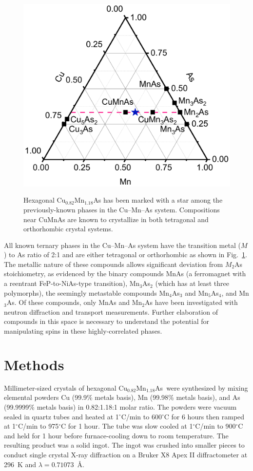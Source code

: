 \documentclass[10pt,doublespacing,edeposit]{uiucthesis2020}
\newcommand*{\cumnas}{Cu$_{0.82}$Mn$_{1.18}$As}
\begin{document}
\begin{mainmatter}
\begin{figure}
\centering\includegraphics[width=0.6\columnwidth]{figures/ch5/phase_diagram_cropped.pdf} \\
\caption{\label{fig:phase_diagram}
{\color{black}Hexagonal Cu$_{0.82}$Mn$_{1.18}$As has been marked with a star among the previously-known phases in the Cu--Mn--As system. Compositions near CuMnAs are known to crystallize in both tetragonal and orthorhombic crystal systems.}
} 
\end{figure}

{\color{black} All known ternary phases in the Cu--Mn--As system have the transition metal ($M$) to As ratio of 2:1 and are either tetragonal or orthorhombic as shown in Fig.\ \ref{fig:phase_diagram}.}
The metallic nature of these compounds allows significant deviation from $M_2$As stoichiometry, as evidenced by the binary compounds MnAs (a ferromagnet with a reentrant FeP-to-NiAs-type transition),\cite{pytlik_magnetic_1985,schwartz_magnetic_1971,Glazkov2003} Mn$_3$As$_2$ (which has at least three polymorphs),\cite{dietrich_crystal_1990,moller_crystal_1993,hagedorn_crystal_1994} the seemingly metastable compounds Mn$_4$As$_3$ and Mn$_5$As$_4$,\cite{hagedorn_synthesis_1995,moller_crystal_1993} and Mn$_3$As.\cite{nowotny_kristallchemische_1951}
Of these compounds, only MnAs and Mn$_2$As have been investigated with neutron diffraction and transport measurements.\cite{Yuzuri1960,austin_magnetic_1962}
Further elaboration of compounds in this space is necessary to understand the potential for manipulating spins in these highly-correlated phases.

\section{Methods}

Millimeter-sized crystals of hexagonal \cumnas\ were synthesized by mixing elemental powders Cu (99.9\% metals basis), Mn (99.98\% metals basis), and As (99.9999\% metals basis) in 0.82:1.18:1 molar ratio. 
The powders were vacuum sealed in quartz tubes and heated at 1$^\circ$C/min to 600$^{\circ}$C for 6 hours then ramped at 1$^{\circ}$C/min to 975$^{\circ}$C for 1 hour. The tube was slow cooled at 1$^{\circ}$C/min to 900$^{\circ}$C and held for 1 hour before furnace-cooling down to room temperature. The resulting product was a solid ingot. The ingot was crushed into smaller pieces to conduct single crystal X-ray diffraction on a Bruker X8 Apex II diffractometer at 296~K and $\lambda = 0.71073$~\AA. 



\end{mainmatter}
\end{document}
